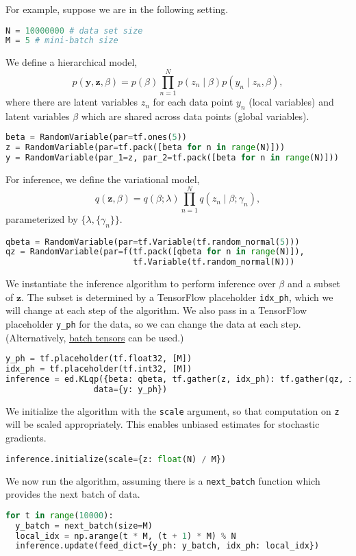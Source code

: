 For example, suppose we are in the following setting.
\begin{lstlisting}[language=Python]
N = 10000000 # data set size
M = 5 # mini-batch size
\end{lstlisting}
We define a hierarchical model,
\begin{equation*}
p(\mathbf{y}, \mathbf{z}, \beta)
= p(\beta) \prod_{n=1}^N p(z_n \mid \beta) p(y_n \mid z_n, \beta),
\end{equation*}
where there are latent variables $z_n$ for
each data point $y_n$ (local variables) and latent variables $\beta$
which are shared across data points (global variables).
\begin{lstlisting}[language=Python]
beta = RandomVariable(par=tf.ones(5))
z = RandomVariable(par=tf.pack([beta for n in range(N)]))
y = RandomVariable(par_1=z, par_2=tf.pack([beta for n in range(N)]))
\end{lstlisting}
For inference, we define the variational model,
\begin{equation*}
q(\mathbf{z}, \beta) =
q(\beta; \lambda) \prod_{n=1}^N q(z_n \mid \beta; \gamma_n),
\end{equation*}
parameterized by $\{\lambda, \{\gamma_n\}\}$.
\begin{lstlisting}[language=Python]
qbeta = RandomVariable(par=tf.Variable(tf.random_normal(5)))
qz = RandomVariable(par=f(tf.pack([qbeta for n in range(N)]),
                          tf.Variable(tf.random_normal(N)))
\end{lstlisting}
We instantiate the inference algorithm to perform inference over
$\beta$ and a subset of $\mathbf{z}$. The subset is determined by
a TensorFlow placeholder \texttt{idx_ph}, which we will change at each
step of the algorithm.
We also pass in a TensorFlow placeholder \texttt{y_ph} for the data,
so we can change the data at each step. (Alternatively,
\href{/api/data}{batch tensors} can be used.)
\begin{lstlisting}[language=Python]
y_ph = tf.placeholder(tf.float32, [M])
idx_ph = tf.placeholder(tf.int32, [M])
inference = ed.KLqp({beta: qbeta, tf.gather(z, idx_ph): tf.gather(qz, idx_ph)},
                  data={y: y_ph})
\end{lstlisting}
We initialize the algorithm with the \texttt{scale} argument, so that
computation on \texttt{z} will be scaled appropriately.
This enables unbiased estimates for stochastic gradients.
\begin{lstlisting}[language=Python]
inference.initialize(scale={z: float(N) / M})
\end{lstlisting}
We now run the algorithm, assuming there is a \texttt{next_batch}
function which provides the next batch of data.
\begin{lstlisting}[language=Python]
for t in range(10000):
  y_batch = next_batch(size=M)
  local_idx = np.arange(t * M, (t + 1) * M) % N
  inference.update(feed_dict={y_ph: y_batch, idx_ph: local_idx})
\end{lstlisting}

